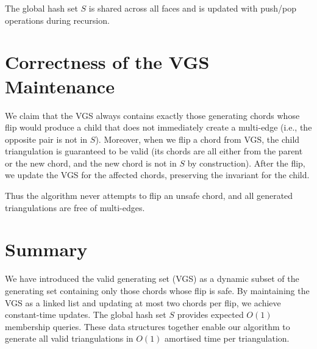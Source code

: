 The global hash set \(S\) is shared across all faces and is updated with push/pop operations during recursion.

\section{Correctness of the VGS Maintenance}
\label{sec:vgs_correctness}

We claim that the VGS always contains exactly those generating chords whose flip would produce a child that does not immediately create a multi-edge (i.e., the opposite pair is not in \(S\)). 
Moreover, when we flip a chord from VGS, the child triangulation is guaranteed to be valid (its chords are all either from the parent or the new chord, and the new chord is not in \(S\) by construction). 
After the flip, we update the VGS for the affected chords, preserving the invariant for the child.

Thus the algorithm never attempts to flip an unsafe chord, and all generated triangulations are free of multi-edges.

\section{Summary}
\label{sec:vgs_summary}

We have introduced the valid generating set (VGS) as a dynamic subset of the generating set containing only those chords whose flip is safe. 
By maintaining the VGS as a linked list and updating at most two chords per flip, we achieve constant-time updates. 
The global hash set \(S\) provides expected \(O(1)\) membership queries. 
These data structures together enable our algorithm to generate all valid triangulations in \(O(1)\) amortised time per triangulation.